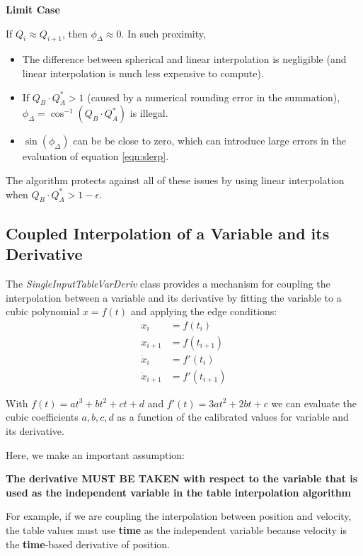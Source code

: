 \documentclass[11pt,fleqn]{report}
\begin{document}
\textbf{Limit Case}

If $Q_i \approx Q_{i+1}$, then $\phi_\Delta \approx 0$.
In such proximity,
\begin{itemize}
  \item The difference between spherical and linear interpolation is
        negligible (and linear interpolation is much less expensive to compute).
  \item If $Q_B \cdot Q_A^* > 1$ (caused by a numerical rounding error in the
        summation), $\phi_\Delta = \cos^{-1} ( Q_B \cdot Q_A^*)$ is illegal.
  \item $\sin(\phi_\Delta)$ can be be close to zero, which can introduce
        large errors in the evaluation of equation \ref{eqn:slerp}.
\end{itemize}

The algorithm protects against all of these issues by using linear
interpolation when $Q_B \cdot Q_A^* > 1 - \epsilon$.


\subsection{Coupled Interpolation of a Variable and its Derivative}
\label{sec:Math_var_deriv}
The \textit{SingleInputTableVarDeriv} class provides a mechanism for
coupling the interpolation between a variable and its derivative by fitting
the variable to a cubic polynomial $x = f(t)$ and applying the edge
conditions:
\begin{align*}
x_i            &= f(t_i) \\
x_{i+1}        &= f(t_{i+1}) \\
{\dot x}_i     &= f'(t_i) \\
{\dot x}_{i+1} &= f'(t_{i+1})
\end{align*}

With $f(t) = at^3 + b t^2 + c t + d$ and $f'(t) = 3a t^2 + 2b t + c$ we can
evaluate the cubic coefficients ${a,b,c,d}$ as a function of the calibrated
values for variable and its derivative.

Here, we make an important assumption:

\textbf{ The derivative MUST BE TAKEN  with respect to the variable that is
used as the independent variable in the table interpolation algorithm}

For example, if we are coupling the interpolation between position and
velocity, the table values must use \textbf{time} as the independent
variable because velocity is the \textbf{time}-based derivative of position.
\end{document}
